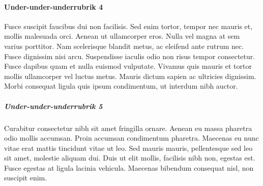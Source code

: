\documentclass[paper=a4, fontsize=11pt]{article} %
\begin{document}
\paragraph{Under-under-underrubrik 4}
Fusce suscipit faucibus dui non facilisis. Sed enim tortor, tempor nec mauris et, mollis malesuada orci. Aenean ut ullamcorper eros. Nulla vel magna at sem varius porttitor. Nam scelerisque blandit metus, ac eleifend ante rutrum nec. Fusce dignissim nisi arcu. Suspendisse iaculis odio non risus tempor consectetur. Fusce dapibus quam et nulla euismod vulputate. Vivamus quis mauris et tortor mollis ullamcorper vel luctus metus. Mauris dictum sapien ac ultricies dignissim. Morbi consequat ligula quis ipsum condimentum, ut interdum nibh auctor.
\subparagraph{Under-under-underrubrik 5}
Curabitur consectetur nibh sit amet fringilla ornare. Aenean eu massa pharetra odio mollis accumsan. Proin accumsan condimentum pharetra. Maecenas eu nunc vitae erat mattis tincidunt vitae ut leo. Sed mauris mauris, pellentesque sed leo sit amet, molestie aliquam dui. Duis ut elit mollis, facilisis nibh non, egestas est. Fusce egestas at ligula lacinia vehicula. Maecenas bibendum consequat nisl, non suscipit enim.
%
\newpage


\newpage
\appendix

\end{document}
